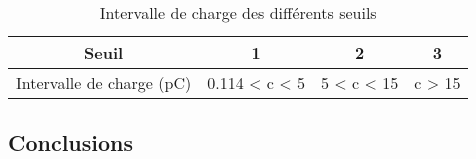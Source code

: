 \begin{table}[H]
  \centering
  \begin{tabular}{|c|c|c|c|}
    \hline
    Seuil  & 1  & 2  & 3 \\ \hline
    Intervalle de charge (pC) & 0.114 < c < 5 & 5 < c < 15 & c > 15 \\ \hline
  \end{tabular}
  \caption{Intervalle de charge des diff\'erents seuils}
  \label{table:4.1}
\end{table}

\subsection{Conclusions}